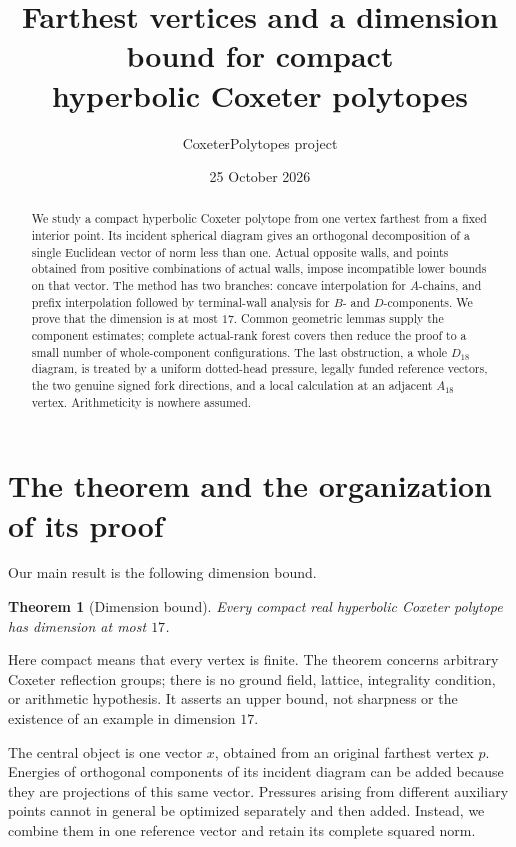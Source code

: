 \documentclass[11pt]{article}
\title{Farthest vertices and a dimension bound for compact\\
hyperbolic Coxeter polytopes}
\author{CoxeterPolytopes project}
\date{25 October 2026}
\newtheorem{theorem}{Theorem}[section]
\theoremstyle{definition}
\theoremstyle{remark}
\begin{document}
\maketitle
\begin{abstract}
We study a compact hyperbolic Coxeter polytope from one vertex farthest
from a fixed interior point. Its incident spherical diagram gives an
orthogonal decomposition of a single Euclidean vector of norm less than
one. Actual opposite walls, and points obtained from positive combinations
of actual walls, impose incompatible lower bounds on that vector.
The method has two branches: concave interpolation for \(A\)-chains,
and prefix interpolation followed by terminal-wall analysis for \(B\)-
and \(D\)-components. We prove that the dimension is at most \(17\).
Common geometric lemmas supply the component estimates; complete
actual-rank forest covers then reduce the proof to a small number
of whole-component configurations.
The last obstruction, a whole \(D_{18}\) diagram, is treated by a uniform
dotted-head pressure, legally funded reference vectors, the two genuine
signed fork directions, and a local calculation at an adjacent
\(A_{18}\) vertex. Arithmeticity is nowhere assumed.
\end{abstract}

\setcounter{tocdepth}{1}
\tableofcontents

\section{The theorem and the organization of its proof}
\label{sec:organization}
Our main result is the following dimension bound.
\begin{theorem}[Dimension bound]
\label{thm:main}
Every compact real hyperbolic Coxeter polytope has dimension at most \(17\).
\end{theorem}
Here compact means that every vertex is finite. The theorem concerns
arbitrary Coxeter reflection groups; there is no ground field, lattice,
integrality condition, or arithmetic hypothesis. It asserts an upper
bound, not sharpness or the existence of an example in dimension \(17\).

The central object is one vector \(x\), obtained from an original
farthest vertex \(p\). Energies of orthogonal components of its incident
diagram can be added because they are projections of this same vector.
Pressures arising from different auxiliary points cannot in general
be optimized separately and then added. Instead, we combine them in
one reference vector and retain its complete squared norm.
\end{document}
